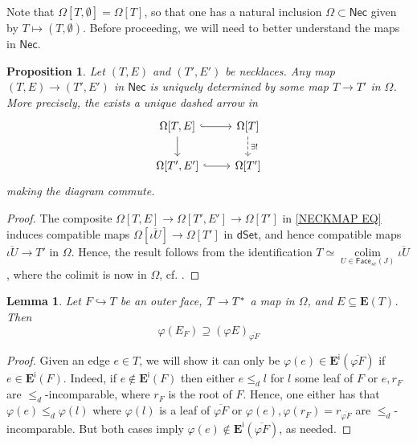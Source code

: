 \documentclass[a4paper,10pt
,draft
]{article}%
\numberwithin{equation}{section}
\numberwithin{figure}{section}
\newtheorem{lemma}[equation]{Lemma}%
\newtheorem{proposition}[equation]{Proposition}%
\theoremstyle{definition} %
\DeclareMathOperator{\colim}{colim}%
\newcommand{\1}{\ensuremath{\mathbbm 1}}%
\begin{document}
Note that 
$\Omega[T,\emptyset] = \Omega[T]$,
so that one has a natural inclusion
$\Omega \subset \mathsf{Nec}$
given by $T \mapsto (T,\emptyset)$.
Before proceeding, we will need to better understand the maps in 
$\mathsf{Nec}$.




\begin{proposition}
Let $(T,E)$ and $(T',E')$ be necklaces. 
Any map $(T,E) \to (T',E')$ in $\mathsf{Nec}$
is uniquely determined by some map 
$T \to T'$ in $\Omega$. 
More precisely, the exists a unique dashed arrow in 
\begin{equation}\label{NECKMAP EQ}
\begin{tikzcd}
	\Omega[T,E] 
	\ar[hookrightarrow]{r} 
	\ar{d}
&
	\Omega[T] 
	\ar[dashed]{d}{\exists !}
\\
	\Omega[T',E']
	\ar[hookrightarrow]{r}
&
	\Omega[T']
\end{tikzcd}
\end{equation}
making the diagram commute.
\end{proposition}

\begin{proof}
	The composite
	$\Omega[T,E] \to 
	\Omega[T',E'] \to 
	\Omega[T']$
	in \eqref{NECKMAP EQ}
	induces compatible maps
	$\Omega[\overline{\iota U}] \to \Omega[T']$
	in $\mathsf{dSet}$,
	and hence 
	compatible maps
	$\overline{\iota U} \to T'$ 
	in $\Omega$.
	Hence, the result follows from the identification
	$T
	\simeq  
	\underset{U \in \mathsf{Face}_{sc}(J)}{\colim}
	\overline{\iota U}$, where the colimit is now in $\Omega$,
	cf. \cite[Cor. 3.70]{BP_geo}.
\end{proof}








\begin{lemma}\label{EFPHI LEM}
	Let $F \hookrightarrow T$
	be an outer face,
	$T \to T^{\**}$ a map in $\Omega$,
	and $E \subseteq \boldsymbol{E}(T)$.
	Then
	\[
	\varphi(E_F) 
	\supseteq 
	\left(\varphi E\right)_{\overline{\varphi F}}
	\]
\end{lemma}


\begin{proof}
Given an edge $e \in T$, 
we will show it can only be
$\varphi(e) \in \boldsymbol{E}^{\mathsf{i}}
(\overline{\varphi F})$
if 
$e \in \boldsymbol{E}^{\mathsf{i}}
(F)$.
Indeed, if $e \nin \boldsymbol{E}^{\mathsf{i}}
(F)$
then either $e \leq_d l$ for $l$ some leaf of $F$
or $e,r_F$ are $\leq_d$-incomparable, where $r_F$ is the root of $F$.
Hence, one either has that
$\varphi(e) \leq_d \varphi(l)$ where $\varphi(l)$ is a leaf of 
$\overline{\varphi F}$
or
$\varphi(e),\varphi(r_F) = r_{\overline{\varphi F}}$
are $\leq_d$-incomparable. But both cases imply 
$\varphi(e) \nin \boldsymbol{E}^{\mathsf{i}}
(\overline{\varphi F})$, as needed.
\end{proof}
\end{document}
